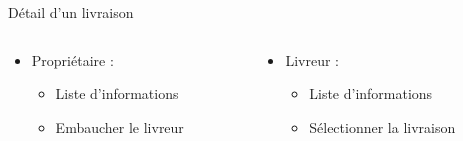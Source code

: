 \documentclass{beamer}
\begin{document}
    \begin{frame}{Détail d'un livraison}
        \begin{columns}
            \begin{column}{.5\linewidth}
                \begin{itemize}[<+- | alert@+>]
                    \item Propriétaire :
                    \begin{itemize}
                        \item Liste d'informations
                        \item Embaucher le livreur
                    \end{itemize}
                \end{itemize}
            \end{column}
            \begin{column}{.5\linewidth}
                \begin{itemize}[<+- | alert@+>]
                    \item Livreur :
                    \begin{itemize}
                        \item Liste d'informations
                        \item Sélectionner la livraison
                    \end{itemize}
                \end{itemize}
            \end{column}
        \end{columns}
    \end{frame}
\end{document}
